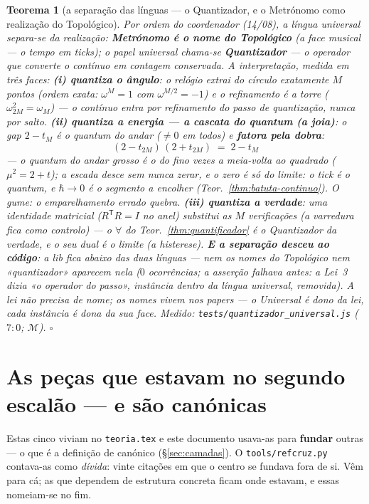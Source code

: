 \documentclass[11pt,a4paper]{article}
\newtheorem{teorema}{Teorema}
\newcommand{\code}[1]{\texttt{\small #1}}
\begin{document}
\begin{teorema}[a separação das línguas --- o Quantizador, e o
Metrónomo como realização do Topológico]\label{thm:quantizador-universal}
Por ordem do coordenador (14/08), a língua universal separa-se da
realização: \textbf{Metrónomo é o nome do Topológico} (a face musical ---
o tempo em ticks); o papel universal chama-se \textbf{Quantizador}
--- \emph{o operador que converte o contínuo em contagem conservada}.
A interpretação, medida em três faces:
\textbf{(i) quantiza o ângulo}: o relógio extrai do círculo
exatamente $M$ pontos (ordem \emph{exata}: $\omega^{M}=1$ com
$\omega^{M/2}=-1$) e o refinamento é a torre
($\omega_{2M}^{2}=\omega_{M}$) --- o contínuo entra por refinamento
do passo de quantização, nunca por salto.
\textbf{(ii) quantiza a energia --- a cascata do quantum (a joia)}:
o gap $2-t_{M}$ é o \emph{quantum do andar} ($\neq0$ em todos) e
\textbf{fatora pela dobra}:
\[
\boxed{\;(2-t_{2M})\,(2+t_{2M})\;=\;2-t_{M}\;}
\]
--- o quantum do andar grosso é o do fino vezes a meia-volta ao
quadrado ($\mu^{2}=2+t$); a escada desce sem nunca zerar, e o zero é
só do limite: \emph{o tick é o quantum, e $\hbar\to0$ é o segmento a
encolher} (Teor.~\ref{thm:batuta-continuo}). O gume: o
emparelhamento errado quebra.
\textbf{(iii) quantiza a verdade}: \emph{uma} identidade matricial
($R^{\mathsf{T}}R=I$ no anel) substitui as $M$ verificações (a
varredura fica como controlo) --- o $\forall$ do
Teor.~\ref{thm:quantificador} é o Quantizador da verdade, e o seu
dual é o limite (a histerese).
\textbf{E a separação desceu ao código}: a lib fica \emph{abaixo}
das duas línguas --- nem os nomes do Topológico nem «quantizador»
aparecem nela ($0$ ocorrências; a asserção \emph{falhava} antes: a
Lei~3 dizia «o operador do passo», instância dentro da língua universal,
removida). A lei não precisa de nome; os nomes vivem nos papers ---
o Universal é dono da lei, cada instância é dona da sua face.
\emph{Medido:} \code{tests/quantizador\_universal.js} ($7{:}0$;
$\mathcal{M}$).
$\square$
\end{teorema}

\section{As peças que estavam no segundo escalão --- e são canónicas}\label{sec:trazidas}

Estas cinco viviam no \code{teoria.tex} e este documento usava-as para \textbf{fundar}
outras --- o que é a definição de canónico (\S\ref{sec:camadas}). O
\code{tools/refcruz.py} contava-as como \emph{dívida}: vinte citações em que o centro se
fundava fora de si. Vêm para cá; as que dependem de estrutura concreta ficam onde estavam,
e essas nomeiam-se no fim.
\end{document}
